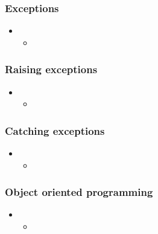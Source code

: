 %
%


\begin{frame}[fragile]
%
  \frametitle{Exceptions}
%
  \begin{itemize}
%
  \item 
    \begin{itemize}
    \item
    \end{itemize}
%
  \end{itemize}
%
\end{frame}

\begin{frame}[fragile]
%
  \frametitle{Raising exceptions}
%
  \begin{itemize}
%
  \item 
    \begin{itemize}
    \item
    \end{itemize}
%
  \end{itemize}
%
\end{frame}

\begin{frame}[fragile]
%
  \frametitle{Catching exceptions}
%
  \begin{itemize}
%
  \item 
    \begin{itemize}
    \item
    \end{itemize}
%
  \end{itemize}
%
\end{frame}

\begin{frame}[fragile]
%
  \frametitle{Object oriented programming}
%
  \begin{itemize}
%
  \item 
    \begin{itemize}
    \item
    \end{itemize}
%
  \end{itemize}
%
\end{frame}

